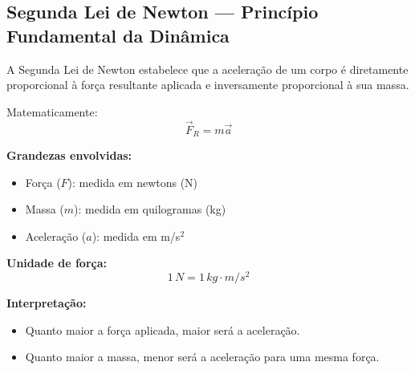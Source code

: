\documentclass[a4paper,12pt]{article}
\begin{document}
\subsection{Segunda Lei de Newton — Princípio Fundamental da Dinâmica}

A Segunda Lei de Newton estabelece que a aceleração de um corpo é diretamente proporcional 
à força resultante aplicada e inversamente proporcional à sua massa.

\begin{center}
\end{center}

Matematicamente:
\[
\vec{F}_R = m \vec{a}
\]

\textbf{Grandezas envolvidas:}
\begin{itemize}
    \item Força ($F$): medida em newtons (N)
    \item Massa ($m$): medida em quilogramas (kg)
    \item Aceleração ($a$): medida em m/s$^2$
\end{itemize}

\textbf{Unidade de força:}
\[
1\,N = 1\,kg \cdot m/s^2
\]

\textbf{Interpretação:}
\begin{itemize}
    \item Quanto maior a força aplicada, maior será a aceleração.
    \item Quanto maior a massa, menor será a aceleração para uma mesma força.
\end{itemize}
\end{document}
